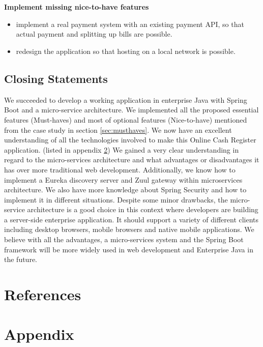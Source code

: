 \documentclass[12pt]{article}
\begin{document}
\begin{multicols}{2}
\\\\
\noindent\textbf{Implement missing nice-to-have features}
\begin{itemize}
	\item implement a real payment system with an existing payment API, so that actual payment and splitting up bills are possible.
	\item redesign the application so that hosting on a local network is possible.
\end{itemize}

\subsection{Closing Statements}
We succeeded to develop a working application in enterprise Java with Spring Boot and a micro-service architecture. We implemented all the proposed essential features (Must-haves) and most of optional features (Nice-to-have) mentioned from the case study in section \ref{sec:musthaves}. We now have an excellent understanding of all the technologies involved to make this Online Cash Register application. (listed in appendix \ref{sec:techlist}) We gained a very clear understanding in regard to the micro-services architecture and what advantages or disadvantages it has over more traditional web development. Additionally, we know how to implement a Eureka discovery server and Zuul gateway within microservices architecture. We also have more knowledge about Spring Security and how to implement it in different situations. Despite some minor drawbacks, the micro-service architecture is a good choice in this context where developers are building a server-side enterprise application. It should support a variety of different clients including desktop browsers, mobile browsers and native mobile applications. We believe with all the advantages, a micro-services system and the Spring Boot framework will be more widely used in web development and Enterprise Java in the future.


\end{multicols}

\newpage
\section{References}




\newpage
\section{Appendix}
\label{sec:techlist}
\end{document}
